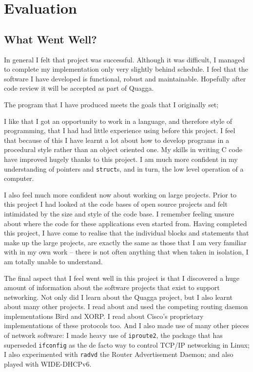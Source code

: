 \documentclass[12pt]{report}
\begin{document}
\chapter{Evaluation}

\section{What Went Well?}
In general I felt that project was successful. Although it was difficult, I
managed to complete my implementation only very slightly behind schedule. I
feel that the software I have developed is functional, robust and maintainable.
Hopefully after code review it will be accepted as part of Quagga.

The program that I have produced meets the goals that I originally set; 

I like that I got an opportunity to work in a language, and therefore style of
programming, that I had had little experience using before this project.  I
feel that because of this I have learnt a lot about how to develop programs in
a procedural style rather than an object oriented one. My skills in writing C
code have improved hugely thanks to this project. I am much more confident in
my understanding of pointers and \texttt{struct}s, and in turn, the low level
operation of a computer.  

I also feel much more confident now about working on large projects. Prior to
this project I had looked at the code bases of open source projects and felt
intimidated by the size and style of the code base. I remember feeling unsure
about where the code for these applications even started from. Having completed
this project, I have come to realise that the individual blocks and statements
that make up the large projects, are exactly the same as those that I am very
familiar with in my own work -- there is not often anything that when taken in
isolation, I am totally unable to understand.

The final aspect that I feel went well in this project is that I discovered a
huge amount of information about the software projects that exist to support
networking. Not only did I learn about the Quagga project, but I also learnt
about many other projects. I read about and used the competing routing daemon
implementations Bird and XORP\@. I read about Cisco's proprietary implementations of
these protocols too. And I also made use of many other pieces of network
software: I made heavy use of \texttt{iproute2}, the package that has
superseded \texttt{ifconfig} as the de facto way to control TCP/IP networking
in Linux; I also experimented with \texttt{radvd} the Router Advertisement
Daemon; and also played with WIDE-DHCPv6. 
\end{document}
